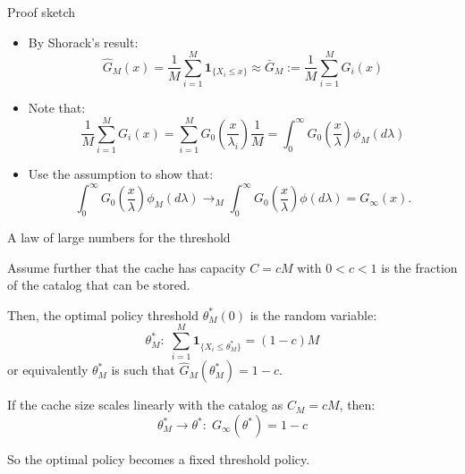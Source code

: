 \documentclass[aspectratio=169]{beamer}
\newcommand{\ind}[1]{\mathbf{1}_{#1}}
\newenvironment*{myitem}[1][1.5em]{\begin{itemize}\setlength{\itemsep}{#1}}{\end{itemize}}
\begin{document}
\begin{frame}{Proof sketch}
	
	\begin{myitem}[2em]

		\item By Shorack's result:
		 \begin{equation*}
			\hat{G}_M(x) = \frac{1}{M}\sum_{i=1}^M \ind{\{X_i\leqslant x\}} \approx \bar{G}_M := \frac{1}{M} \sum_{i=1}^M G_i(x)
		 \end{equation*}

		 \item Note that:
		 \begin{equation*}
			\frac{1}{M} \sum_{i=1}^M G_i(x) = \sum_{i=1}^M G_0\left(\frac{x}{\lambda_i}\right) \frac{1}{M} = \int_0^\infty G_0\left(\frac{x}{\lambda}\right) \phi_M(d\lambda)
		 \end{equation*}

		 \item Use the assumption to show that:
		 \begin{equation*}
			\int_0^\infty G_0\left(\frac{x}{\lambda}\right) \phi_M(d\lambda) \to_M \int_0^\infty G_0\left(\frac{x}{\lambda}\right) \phi(d\lambda) = G_\infty(x).
		 \end{equation*}

	\end{myitem}
\end{frame}

\begin{frame}{A law of large numbers for the threshold}
	
	Assume further that the cache has capacity $C=cM$ with $0<c<1$ is the fraction of the catalog that can be stored.

	\pause

	Then, the optimal policy threshold $\theta^*_M(0)$ is the random variable:
	\begin{equation*}
		\theta^*_M: \; \sum_{i=1}^M \ind{\{X_i\leqslant \theta^*_M\}} = (1-c)M
	\end{equation*}
	or equivalently $\theta^*_M$ is such that $\hat{G}_M(\theta^*_M) = 1-c$.


	\pause \vfill

	\begin{corollary}
		If the cache size scales linearly with the catalog as $C_M = cM$, then:
		\begin{equation*}
			\theta^*_M \to \theta^*: \; G_\infty(\theta^*) = 1-c
		\end{equation*}
	\end{corollary}

	So the optimal policy becomes a \alert{fixed} threshold policy.
\end{frame}
\end{document}
